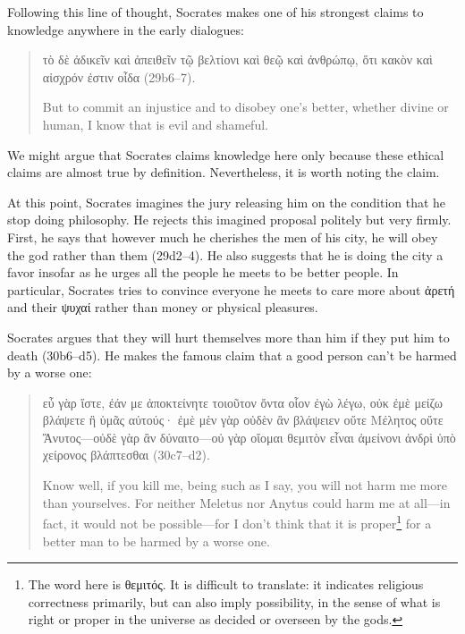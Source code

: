 \documentclass[11pt]{article}
\begin{document}
Following this line of thought, Socrates makes one of his strongest claims
to knowledge anywhere in the early dialogues:

\begin{quote}

    {\g
    τὸ δὲ ἀδικεῖν καὶ ἀπειθεῖν τῷ βελτίονι καὶ θεῷ καὶ ἀνθρώπῳ, ὅτι κακὸν
    καὶ αἰσχρόν ἐστιν οἶδα
    } (29b6--7).

    But to commit an injustice and to disobey one's better, whether divine
    or human, I know that is evil and shameful.

\end{quote}

We might argue that Socrates claims knowledge here only because these
ethical claims are almost true by definition.  Nevertheless, it is worth
noting the claim.

At this point, Socrates imagines the jury releasing him on the condition
that he stop doing philosophy.  He rejects this imagined proposal politely
but very firmly.  First, he says that however much he cherishes the men of
his city, he will obey the god rather than them (29d2--4).  He also
suggests that he is doing the city a favor insofar as he urges all the
people he meets to be better people.  In particular, Socrates tries to
convince everyone he meets to care more about {\g ἀρετή} and their {\g
ψυχαί} rather than money or physical pleasures.

Socrates argues that they will hurt themselves more than him if they put
him to death (30b6--d5).  He makes the famous claim that a good person
can't be harmed by a worse one:

\begin{quote}
    {\g
    εὖ γὰρ ἴστε, ἐάν με ἀποκτείνητε τοιοῦτον ὄντα οἷον ἐγὼ λέγω, οὐκ ἐμὲ
    μείζω βλάψετε ἢ ὑμᾶς αὐτούς· ἐμὲ μὲν γὰρ οὐδὲν ἂν βλάψειεν οὔτε Μέλητος
    οὔτε Ἄνυτος---οὐδὲ γὰρ ἂν δύναιτο---οὐ γὰρ οἴομαι θεμιτὸν εἶναι
    ἀμείνονι ἀνδρὶ ὑπὸ χείρονος βλάπτεσθαι
    } (30c7--d2).

    Know well, if you kill me, being such as I say, you will not harm me
    more than yourselves. For neither Meletus nor Anytus could harm me at
    all---in fact, it would not be possible---for I don't think that it is
    proper\footnote{The word here is {\g θεμιτός}.  It is difficult to
    translate: it indicates religious correctness primarily, but can also
    imply possibility, in the sense of what is right or proper in the
    universe as decided or overseen by the gods.} for a better man to be
    harmed by a worse one.

\end{quote}
\end{document}
